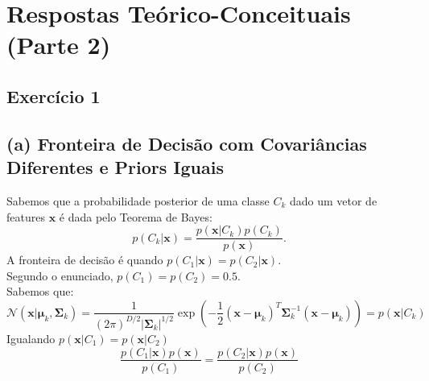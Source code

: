 \documentclass[conference]{IEEEtran}
\begin{document}
\section{Respostas Teórico-Conceituais (Parte 2)}
\label{sec:teoria}

\subsection{Exercício 1}
\label{subsec:ex1}
\subsection*{(a) Fronteira de Decisão com Covariâncias Diferentes e Priors Iguais}

Sabemos que a probabilidade posterior de uma classe $C_k$ dado um vetor de features $\mathbf{x}$ é dada pelo Teorema de Bayes:
\[
p(C_k | \mathbf{x}) = \frac{p(\mathbf{x} | C_k) p(C_k)}{p(\mathbf{x})}.
\]
A fronteira de decisão é quando $p(C_1 | \mathbf{x}) = p(C_2 | \mathbf{x})$. \\
Segundo o enunciado,  $p(C_1) = p(C_2) = 0.5$. \\

Sabemos que:
\[
\mathcal{N}(\mathbf{x} | \boldsymbol{\mu}_k, \boldsymbol{\Sigma}_k) = \frac{1}{(2\pi)^{D/2} |\boldsymbol{\Sigma}_k|^{1/2}} \exp\left(-\frac{1}{2} (\mathbf{x} - \boldsymbol{\mu}_k)^T \boldsymbol{\Sigma}_k^{-1} (\mathbf{x} - \boldsymbol{\mu}_k)\right) = p(\mathbf{x} | C_k)
\]
Igualando $p(\mathbf{x} | C_1) = p(\mathbf{x} | C_2)$
\[
\frac{p(C_1 | \mathbf{x})p(\mathbf{x})}{p(C_1)} = \frac{p(C_2 | \mathbf{x})p(\mathbf{x})}{p(C_2)} 
\]
\end{document}

